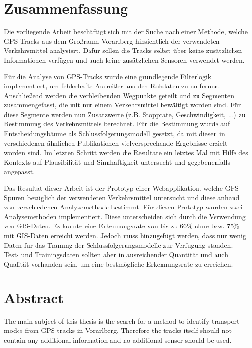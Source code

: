\section*{Zusammenfassung}

Die vorliegende Arbeit beschäftigt sich mit der Suche nach einer Methode, welche GPS-Tracks  aus dem Großraum Vorarlberg hinsichtlich der verwendeten Verkehrsmittel analysiert. Dafür sollen die Tracks selbst über keine zusätzlichen Informationen verfügen und auch keine zusätzlichen Sensoren verwendet werden.

Für die Analyse von GPS-Tracks wurde eine grundlegende Filterlogik implementiert, um fehlerhafte Ausreißer aus den Rohdaten zu entfernen. Anschließend werden die verbleibenden Wegpunkte geteilt und zu Segmenten zusammengefasst, die mit nur einem Verkehrsmittel bewältigt worden sind. Für diese Segmente werden nun Zusatzwerte (z.B. Stopprate, Geschwindigkeit, ...) zu Bestimmung des Verkehrsmittels berechnet. Für die Bestimmung wurde auf Entscheidungsbäume als Schlussfolgerungsmodell gesetzt, da mit diesen in verschiedenen ähnlichen Publikationen vielversprechende Ergebnisse erzielt worden sind. Im letzten Schritt werden die Resultate ein letztes Mal mit Hilfe des Kontexts auf Plausibilität und Sinnhaftigkeit untersucht und gegebenenfalls angepasst.

Das Resultat dieser Arbeit ist der Prototyp einer Webapplikation, welche GPS-Spuren bezüglich der verwendeten Verkehrsmittel untersucht und diese anhand von verschiedenen Analysemethode bestimmt. Für diesen Prototyp wurden zwei Analysemethoden implementiert. Diese unterscheiden sich durch die Verwendung von GIS-Daten. Es konnte eine Erkennungsrate von bis zu 66\% ohne bzw. 75\% mit GIS-Daten erreicht werden. Jedoch muss hinzugefügt werden, dass nur wenig Daten für das Training der Schlussfolgerungsmodelle zur Verfügung standen. Test- und Trainingsdaten sollten aber  in ausreichender Quantität und auch Qualität vorhanden sein, um eine bestmögliche Erkennungsrate zu erreichen.

\afterpage{\blankpage}
\newpage

\section*{Abstract}

The main subject of this thesis is the search for a method to identify transport modes from GPS tracks in Vorarlberg. Therefore the tracks itself should not contain any additional information and no additional sensor should be used.

